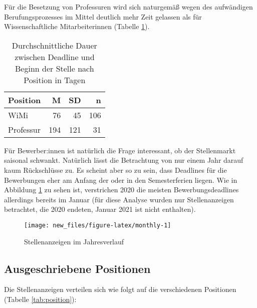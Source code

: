 \documentclass[
]{article}
\begin{document}
Für die Besetzung von Professuren wird sich naturgemäß wegen des aufwändigen Berufungsprozesses im Mittel deutlich mehr Zeit gelassen als für Wissenschaftliche Mitarbeiterinnen (Tabelle \ref{tab:timeperposition}).

\begin{table}[H]

\caption{\label{tab:timeperposition}Durchschnittliche Dauer zwischen Deadline und Beginn der Stelle nach Position in Tagen}
\centering
\begin{tabular}[t]{l|r|r|r}
\hline
Position & M & SD & n\\
\hline
WiMi & 76 & 45 & 106\\
\hline
Professur & 194 & 121 & 31\\
\hline
\end{tabular}
\end{table}

Für Bewerber:innen ist natürlich die Frage interessant, ob der Stellenmarkt saisonal schwankt. Natürlich lässt die Betrachtung von nur einem Jahr darauf kaum Rückschlüsse zu. Es scheint aber so zu sein, dass Deadlines für die Bewerbungen eher am Anfang der oder in den Semesterferien liegen. Wie in Abbildung \ref{fig:monthly} zu sehen ist, verstrichen 2020 die meisten Bewerbungsdeadlines allerdings bereits im Januar (für diese Analyse wurden nur Stellenanzeigen betrachtet, die 2020 endeten, Januar 2021 ist nicht enthalten).

\begin{figure}

\texttt{[image: new\_files/figure-latex/monthly-1]} \hfill{}

\caption{Stellenanzeigen im Jahresverlauf}\label{fig:monthly}
\end{figure}

\hypertarget{ausgeschriebene-positionen}{%
\subsection{Ausgeschriebene Positionen}\label{ausgeschriebene-positionen}}

Die Stellenanzeigen verteilen sich wie folgt auf die verschiedenen Positionen (Tabelle \ref{tab:position}):
\end{document}
